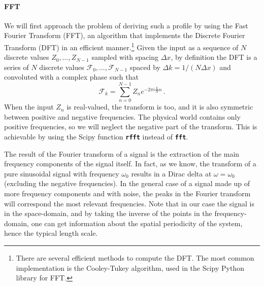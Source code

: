 \paragraph{FFT}
We will first approach the problem of deriving such a profile by using the Fast Fourier Transform (FFT), an algorithm that implements the Discrete Fourier Transform (DFT) in an efficient manner.\footnote{There are several efficient methods to compute the DFT. The most common implementation is the Cooley-Tukey algorithm, used in the Scipy Python library for FFT.} Given the input as a sequence of $N$ discrete values $Z_0,\dots,Z_{N-1}$ sampled with spacing $\Delta x$, by definition the DFT is a series of $N$ discrete values $\mathcal{F}_0,\dots,\mathcal{F}_{N-1}$ spaced by $\Delta k = 1/(N\Delta x)$ and convoluted with a complex phase such that
\begin{equation*}
    \mathcal{F}_k = \sum_{n=0}^{N-1} Z_n e^{-2\pi i \frac{k}{N}n}\, .
\end{equation*}
When the input $Z_n$ is real-valued, the transform is too, and it is also symmetric between positive and negative frequencies. The physical world contains only positive frequencies, so we will neglect the negative part of the transform. This is achievable by using the Scipy function \texttt{\textbf{rfft}} instead of \texttt{\textbf{fft}}.

The result of the Fourier transform of a signal is the extraction of the main frequency components of the signal itself. In fact, as we know, the transform of a pure sinusoidal signal with frequency $\omega_0$ results in a Dirac delta at $\omega = \omega_0$ (excluding the negative frequencies). In the general case of a signal made up of more frequency components and with noise, the peaks in the Fourier transform will correspond the most relevant frequencies. Note that in our case the signal is in the space-domain, and by taking the inverse of the points in the frequency-domain, one can get information about the spatial periodicity of the system, hence the typical length scale.

